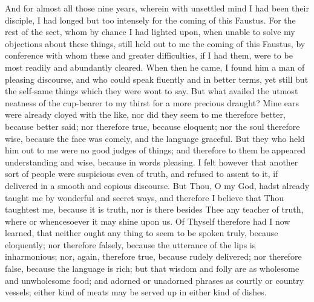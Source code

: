 \documentclass[b5paper,openright,12pt,twoside]{book}
\begin{document}
And for almost all those nine years, wherein with unsettled mind I had
been their disciple, I had longed but too intensely for the coming of
this Faustus. For the rest of the sect, whom by chance I had lighted
upon, when unable to solve my objections about these things, still held
out to me the coming of this Faustus, by conference with whom these
and greater difficulties, if I had them, were to be most readily and
abundantly cleared. When then he came, I found him a man of pleasing
discourse, and who could speak fluently and in better terms, yet still
but the self-same things which they were wont to say. But what availed
the utmost neatness of the cup-bearer to my thirst for a more precious
draught? Mine ears were already cloyed with the like, nor did they seem
to me therefore better, because better said; nor therefore true, because
eloquent; nor the soul therefore wise, because the face was comely,
and the language graceful. But they who held him out to me were no good
judges of things; and therefore to them he appeared understanding and
wise, because in words pleasing. I felt however that another sort of
people were suspicious even of truth, and refused to assent to it, if
delivered in a smooth and copious discourse. But Thou, O my God, hadst
already taught me by wonderful and secret ways, and therefore I believe
that Thou taughtest me, because it is truth, nor is there besides Thee
any teacher of truth, where or whencesoever it may shine upon us. Of
Thyself therefore had I now learned, that neither ought any thing to
seem to be spoken truly, because eloquently; nor therefore falsely,
because the utterance of the lips is inharmonious; nor, again, therefore
true, because rudely delivered; nor therefore false, because the
language is rich; but that wisdom and folly are as wholesome and
unwholesome food; and adorned or unadorned phrases as courtly or country
vessels; either kind of meats may be served up in either kind of dishes.
\end{document}
